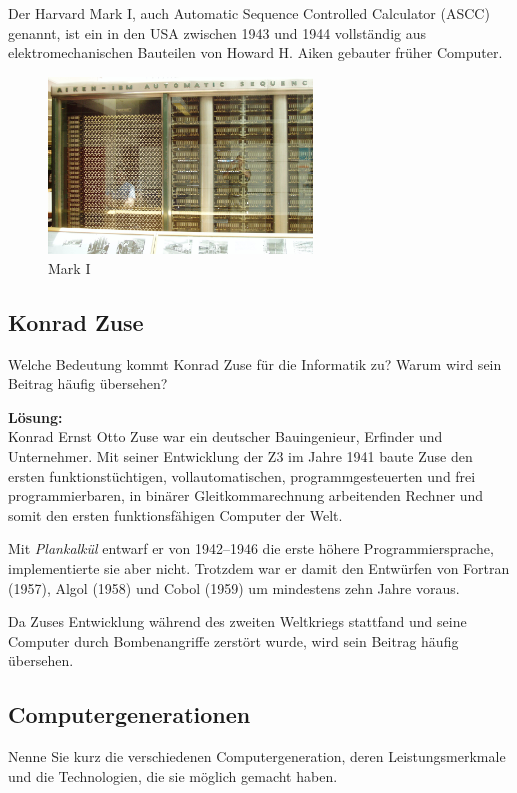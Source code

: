 \documentclass[11pt,a4paper,DIV=12]{scrartcl}
\newcommand{\loesung}{\textbf{Lösung:}\\}
\begin{document}
Der Harvard Mark I, auch Automatic Sequence Controlled Calculator (ASCC) genannt, ist ein in den USA zwischen 1943 und 1944 vollständig aus elektromechanischen Bauteilen von Howard H. Aiken gebauter früher Computer.

\begin{figure}[ht!]
  \centering
  \includegraphics[width=7cm]{img/mark_i_wikipedia.jpg}
  \caption{Mark I}
\end{figure}

\subsection{Konrad Zuse}
Welche Bedeutung kommt Konrad Zuse für die Informatik zu? Warum wird sein Beitrag häufig übersehen?

\loesung
Konrad Ernst Otto Zuse war ein deutscher Bauingenieur, Erfinder und Unternehmer. Mit seiner Entwicklung der Z3 im Jahre 1941 baute Zuse den ersten funktionstüchtigen, vollautomatischen, programmgesteuerten und frei programmierbaren, in binärer Gleitkommarechnung arbeitenden Rechner und somit den ersten funktionsfähigen Computer der Welt.

Mit \emph{Plankalkül} entwarf er von 1942--1946 die erste höhere Programmiersprache, implementierte sie aber nicht. Trotzdem war er damit den Entwürfen von Fortran (1957), Algol (1958) und Cobol (1959) um mindestens zehn Jahre voraus.

Da Zuses Entwicklung während des zweiten Weltkriegs stattfand und seine Computer durch Bombenangriffe zerstört wurde, wird sein Beitrag häufig übersehen.

\subsection{Computergenerationen}
Nenne Sie kurz die verschiedenen Computergeneration, deren Leistungsmerkmale und die Technologien, die sie möglich gemacht haben.
\end{document}
